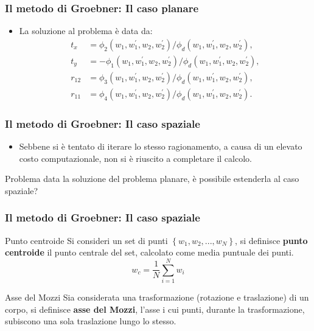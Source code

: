 \documentclass{beamer}
\begin{document}
\begin{frame}
\frametitle{Il metodo di Groebner: Il caso planare}
\begin{itemize}
	\item La soluzione al problema è data da:
	\begin{align}
	t_x &= \phi_2(w_1, w_1^{'}, w_2, w_2^{'})/\phi_d(w_1, w_1^{'}, w_2, w_2^{'}),\\
	t_y &= - \phi_1(w_1, w_1^{'}, w_2, w_2^{'})/\phi_d(w_1, w_1^{'}, w_2, w_2^{'}),\\
	r_{12} &= \phi_3(w_1, w_1^{'}, w_2, w_2^{'})/\phi_d(w_1, w_1^{'}, w_2, w_2^{'}),\\
	r_{11} &= \phi_4(w_1, w_1^{'}, w_2, w_2^{'})/\phi_d(w_1, w_1^{'}, w_2, w_2^{'}).
	\end{align}
\end{itemize}
\end{frame}

\begin{frame}
\frametitle{Il metodo di Groebner: Il caso spaziale}

\begin{itemize}
	\item Sebbene si è tentato di iterare lo stesso ragionamento, a causa di un elevato costo computazionale, non si è riuscito a completare il calcolo.
\end{itemize}
\begin{block}{Problema}
	data la soluzione del problema planare, è possibile estenderla al caso spaziale?
\end{block}
\end{frame}

\begin{frame}
\frametitle{Il metodo di Groebner: Il caso spaziale}
\begin{block}{Punto centroide}
	Si consideri un set di punti $\left\lbrace w_1, w_2, ..., w_N \right\rbrace$, si definisce \textbf{punto centroide} il punto centrale del set, calcolato come media puntuale dei punti.
	\begin{equation}
	w_c = \frac{1}{N}\sum_{i = 1}^{N} w_i
	\end{equation}
\end{block}

\begin{block}{Asse del Mozzi}
	Sia considerata una trasformazione (rotazione e traslazione) di un corpo, si definisce \textbf{asse del Mozzi}, l'asse i cui punti, durante la trasformazione, subiscono una sola traslazione lungo lo stesso.
\end{block}
\end{frame}
\end{document}
